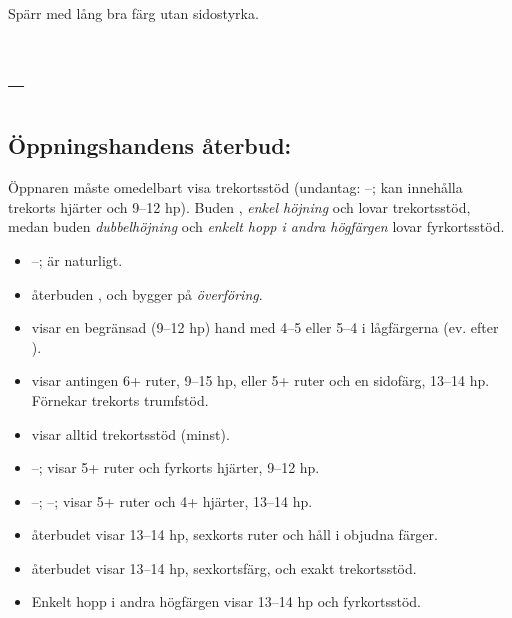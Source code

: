 \item[\ho{4}] Sp\"arr med l\aa{}ng bra f\"arg utan sidostyrka.

\ebe

\section{ -- }

\subsection*{\"Oppningshandens {\aa}terbud:}

Öppnaren måste omedelbart visa trekortsstöd (undantag: --;
 kan innehålla trekorts hjärter och 9--12 hp). Buden ,
{\em enkel höjning} och  lovar trekortsstöd, medan buden
{\em dubbelhöjning} och {\em enkelt hopp i andra högfärgen}
lovar fyrkortsstöd.

\begin{itemize}

\item {}--;  är naturligt.

\item återbuden ,  och  bygger på {\em överföring}.

\item {} visar en begränsad (9--12 hp) hand med 4--5 eller 5--4 i
lågfärgerna (ev.  efter ).

\item {} visar antingen 6+ ruter, 9--15 hp, eller 5+ ruter och
             en sidofärg, 13--14 hp. Förnekar trekorts trumfstöd.

\item {} visar alltid trekortsstöd (minst).

\item {}--;  visar 5+ ruter och fyrkorts hjärter, 9--12 hp.

\item {}--; --;  visar 5+ ruter och 4+ hjärter,
       13--14 hp.

\item återbudet  visar 13--14 hp, sexkorts ruter och håll i objudna
      färger.

\item återbudet  visar 13--14 hp, sexkortsfärg, och exakt trekortsstöd.

\item Enkelt hopp i andra högfärgen visar 13--14 hp och fyrkortsstöd.

\end{itemize}

